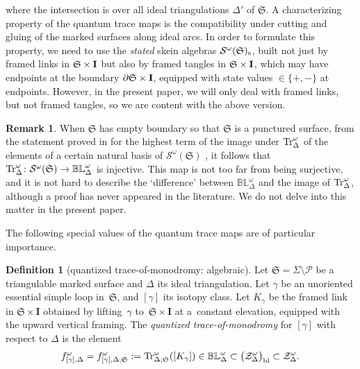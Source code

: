\documentclass[10pt,a4paper]{amsart}
\numberwithin{equation}{section}
\theoremstyle{definition}
\newtheorem{Definition}[Theorem]{Definition}
\newtheorem{Remark}[Theorem]{Remark}
\begin{document}
where the intersection is over all ideal triangulations $\Delta'$ of $\mathfrak{S}$. A characterizing property of the quantum trace maps is the compatibility under cutting and gluing of the marked surfaces along ideal arcs. In order to formulate this property, we need to use the {\em stated} skein algebras $\mathcal{S}^\omega(\mathfrak{S})_{\rm s}$, built not just by framed links in $\mathfrak{S} \times {\bf I}$ but also by framed tangles in $\mathfrak{S} \times {\bf I}$, which may have endpoints at the boundary $\partial \mathfrak{S} \times {\bf I}$, equipped with state values $\in \{+,-\}$ at endpoints. However, in the present paper, we will only deal with framed links, but not framed tangles, so we are content with the above version.
\begin{Remark}
\label{rem:highest_term}
When $\mathfrak{S}$ has empty boundary so that $\mathfrak{S}$ is a punctured surface, from the statement proved in \cite{AK} for the highest term of the image under ${\rm Tr}^\omega_\Delta$ of the elements of a certain natural basis of $\mathcal{S}^\omega(\mathfrak{S})$ \cite{DThurston}, it follows that ${\rm Tr}^\omega_\Delta \colon \mathcal{S}^\omega(\mathfrak{S}) \to \mathbb{BL}^\omega_\Delta$ is injective. This map is not too far from being surjective, and it is not hard to describe the `difference' between $\mathbb{BL}^\omega_\Delta$ and the image of ${\rm Tr}^\omega_\Delta$, although a proof has never appeared in the literature. We do not delve into this matter in the present paper.
\end{Remark}
The following special values of the quantum trace maps are of particular importance.
\begin{Definition}[quantized trace-of-monodromy: algebraic]
\label{def:quantized_trace-of-monodromy}
Let $\mathfrak{S} = \Sigma\setminus\mathcal{P}$ be a triangulable marked surface and $\Delta$ its ideal triangulation. Let $\gamma$ be an unoriented essential simple loop in~$\mathfrak{S}$, and $[\gamma]$ its isotopy class. Let $K_\gamma$ be the framed link in $\mathfrak{S} \times \mathbf{I}$ obtained by lifting~$\gamma$ to~$\mathfrak{S} \times \mathbf{I}$ at a~constant elevation, equipped with the upward vertical framing. The {\em quantized trace-of-monodromy} for $[\gamma]$ with respect to $\Delta$ is the element
\begin{align}
\label{eq:f_omega}
f^\omega_{[\gamma],\Delta} = f^\omega_{[\gamma],\Delta;\mathfrak{S}} := {\rm Tr}^\omega_{\Delta;\mathfrak{S}}([K_\gamma]) \in
\mathbb{BL}^\omega_\Delta \subset \bigl(\mathcal{Z}^\omega_\Delta\bigr)_{\rm bl} \subset \mathcal{Z}^\omega_\Delta.
\end{align}
\end{Definition}
\end{document}
